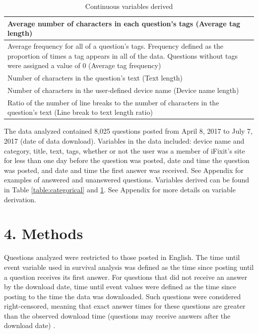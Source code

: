 \documentclass{article}
\begin{document}
\begin{table}[!htbp]
\centering
\begin{tabular}{|p{10cm}|}
  \hline
  Average number of characters in each question's tags (Average tag length) \\ \hline
  Average frequency for all of a question's tags. Frequency defined as the proportion of times a tag appears in all of the data. Questions without tags were assigned a value of 0 (Average tag frequency) \\ \hline
  Number of characters in the question's text (Text length) \\ \hline
  Number of characters in the user-defined device name (Device name length) \\ \hline
  Ratio of the number of line breaks to the number of characters in the question's text (Line break to text length ratio) \\ \hline
\end{tabular}
\caption{Continuous variables derived}
\label{table:continuous}
\end{table}

The data analyzed contained 8,025 questions posted from April 8, 2017 to July 7, 2017 (date of data download). Variables in the data included: device name and category, title, text, tags, whether or not the user was a member of iFixit's site for less than one day before the question was posted, date and time the question was posted, and date and time the first answer was received. See Appendix for examples of answered and unanswered questions. Variables derived can be found in Table \ref{table:categorical} and \ref{table:continuous}. See Appendix for more details on variable derivation. 


\section*{4. Methods}

Questions analyzed were restricted to those posted in English. The time until event variable used in survival analysis was defined as the time since posting until a question receives its first answer. For questions that did not receive an answer by the download date, time until event values were defined as the time since posting to the time the data was downloaded. Such questions were considered right-censored, meaning that exact answer times for these questions are greater than the observed download time (questions may receive answers after the download date) \cite{Kleinbaum2011}. 
\end{document}
